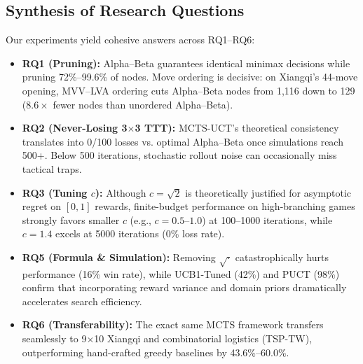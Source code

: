 \documentclass[conference]{IEEEtran}
\begin{document}
\subsection{Synthesis of Research Questions}
Our experiments yield cohesive answers across RQ1--RQ6:
\begin{itemize}
    \item \textbf{RQ1 (Pruning):} Alpha--Beta guarantees identical minimax decisions while pruning 72\%--99.6\% of nodes. Move ordering is decisive: on Xiangqi's 44-move opening, MVV--LVA ordering cuts Alpha--Beta nodes from 1,116 down to 129 ($8.6\times$ fewer nodes than unordered Alpha--Beta).
    \item \textbf{RQ2 (Never-Losing 3$\times$3 TTT):} MCTS-UCT's theoretical consistency translates into 0/100 losses vs. optimal Alpha--Beta once simulations reach 500+. Below 500 iterations, stochastic rollout noise can occasionally miss tactical traps.
    \item \textbf{RQ3 (Tuning $c$):} Although $c = \sqrt{2}$ is theoretically justified for asymptotic regret on $[0,1]$ rewards, finite-budget performance on high-branching games strongly favors smaller $c$ (e.g., $c=0.5$--$1.0$) at 100--1000 iterations, while $c=1.4$ excels at 5000 iterations (0\% loss rate).
    \item \textbf{RQ5 (Formula \& Simulation):} Removing $\sqrt{\cdot}$ catastrophically hurts performance (16\% win rate), while UCB1-Tuned (42\%) and PUCT (98\%) confirm that incorporating reward variance and domain priors dramatically accelerates search efficiency.
    \item \textbf{RQ6 (Transferability):} The exact same MCTS framework transfers seamlessly to 9$\times$10 Xiangqi and combinatorial logistics (TSP-TW), outperforming hand-crafted greedy baselines by 43.6\%--60.0\%.
\end{itemize}
\end{document}
